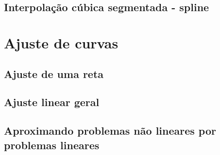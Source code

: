 \documentclass[12pt]{article}
\theoremstyle{plain}
\theoremstyle{definition}
\theoremstyle{remark}
\begin{document}
\subsection{Interpolação cúbica segmentada - spline}

\section{Ajuste de curvas}

\subsection{Ajuste de uma reta}
\subsection{Ajuste linear geral}
\subsection{Aproximando problemas não lineares por problemas lineares}
\end{document}
